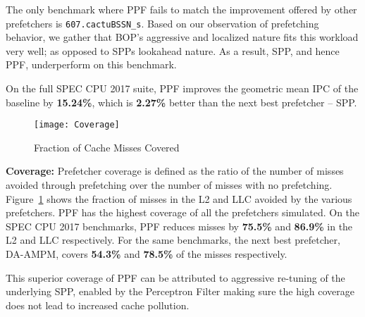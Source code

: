 The only benchmark where PPF fails to match the improvement offered by
other prefetchers is {\tt 607.cactuBSSN\_s}.  Based on our observation
of prefetching behavior, we gather that BOP's aggressive and localized
nature fits this workload very well; as opposed to SPPs lookahead
nature.  As a result, SPP, and hence PPF, underperform on this
benchmark.


On the full SPEC CPU 2017 suite, PPF improves the geometric mean IPC
of the baseline by \textbf{15.24\%}, which is \textbf{2.27\%} better
than the next best prefetcher -- SPP.

\begin{figure}[ht]
\texttt{[image: Coverage]}
\caption{Fraction of Cache Misses Covered}
\label{Fig:Coverage}
\end{figure}
%

\noindent \textbf{Coverage:} Prefetcher coverage is defined as the
ratio of the number of misses avoided through prefetching over the
number of misses with no prefetching.  Figure~\ref{Fig:Coverage} shows
the fraction of misses in the L2 and LLC avoided by the various
prefetchers.  PPF has the highest coverage of all the prefetchers
simulated.  On the SPEC CPU 2017 benchmarks, PPF reduces misses by
\textbf{75.5\%} and \textbf{86.9\%} in the L2 and LLC
respectively. For the same benchmarks, the next best prefetcher,
DA-AMPM, covers \textbf{54.3\%} and \textbf{78.5\%} of the misses
respectively.

This superior coverage of PPF can be attributed to aggressive
re-tuning of the underlying SPP, enabled by the Perceptron Filter
making sure the high coverage does not lead to increased cache
pollution.


